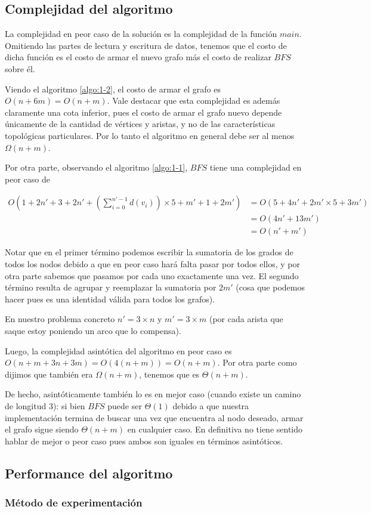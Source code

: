 \subsection{Complejidad del algoritmo}
La complejidad en peor caso de la solución es la complejidad de la función $main$. Omitiendo las partes de lectura y escritura de datos, tenemos que el costo de dicha función es el costo de armar el nuevo grafo más el costo de realizar $BFS$ sobre él.

Viendo el algoritmo \ref{algo:1-2}, el costo de armar el grafo es $O(n+6m) = O(n+m)$. Vale destacar que esta complejidad es además claramente una cota inferior, pues el costo de armar el grafo nuevo depende únicamente de la cantidad de vértices y aristas, y no de las características topológicas particulares. Por lo tanto el algoritmo en general debe ser al menos $\Omega(n+m)$.

Por otra parte, observando el algoritmo \ref{algo:1-1}, $BFS$ tiene una complejidad en peor caso de 

\begin{equation}
\begin{aligned}
	O(1+2n'+3+2n'+(\sum_{i=0}^{n'-1}d(v_{i}))\times 5 + m' + 1 + 2m') & = O(5+4n'+2m'\times 5 + 3m') \\
	&= O(4n'+13m') \\
	&= O(n'+m')
\end{aligned}
\end{equation}

Notar que en el primer término podemos escribir la sumatoria de los grados de todos los nodos debido a que en peor caso hará falta pasar por todos ellos, y por otra parte sabemos que pasamos por cada uno exactamente una vez. El segundo término resulta de agrupar y reemplazar la sumatoria por $2m'$ (cosa que podemos hacer pues es una identidad válida para todos los grafos).

En nuestro problema concreto $n'=3\times n$ y $m' = 3\times m$ (por cada arista que saque estoy poniendo un arco que lo compensa).

Luego, la complejidad asintótica del algoritmo en peor caso es $O(n+m+3n+3m) = O(4(n+m)) = O(n+m)$. Por otra parte como dijimos que también era $\Omega(n+m)$, tenemos que es $\Theta(n+m)$.

De hecho, asintóticamente también lo es en mejor caso (cuando existe un camino de longitud 3): si bien $BFS$ puede ser $\Theta(1)$ debido a que nuestra implementación termina de buscar una vez que encuentra al nodo deseado, armar el grafo sigue siendo $\Theta(n+m)$ en cualquier caso. En definitiva no tiene sentido hablar de mejor o peor caso pues ambos son iguales en términos asintóticos.

\subsection{Performance del algoritmo}

\subsubsection{M\'etodo de experimentación}
